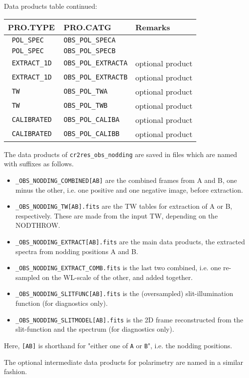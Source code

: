 \pagebreak

Data products table continued:

\begin{tabular}{|l|l|l|}
    \hline
    \textbf{PRO.TYPE} &
    \textbf{PRO.CATG} &
    \textbf{Remarks} \\
    \hline
    \texttt{   POL\_SPEC     } & \texttt{OBS\_POL\_SPECA}                & \\
    \texttt{   POL\_SPEC     } & \texttt{OBS\_POL\_SPECB}                & \\
\texttt{   EXTRACT\_1D     } & \texttt{OBS\_POL\_EXTRACTA}                & optional product\\
\texttt{   EXTRACT\_1D     } & \texttt{OBS\_POL\_EXTRACTB}                & optional product\\
\texttt{   TW     } & \texttt{OBS\_POL\_TWA}                & optional product\\
\texttt{   TW     } & \texttt{OBS\_POL\_TWB}                & optional product\\
\texttt{   CALIBRATED     } & \texttt{OBS\_POL\_CALIBA}                & optional product\\
\texttt{   CALIBRATED     } & \texttt{OBS\_POL\_CALIBB}                & optional product\\
\hline
\end{tabular}
\label{tab:pol-prods}

\hrulefill

The data products of \texttt{cr2res\_obs\_nodding} are saved in files which are
named with suffixes as follows.
\begin{itemize}
    \item \verb!_OBS_NODDING_COMBINED[AB]! are the combined frames from A and B, one minus the other, i.e. one positive and one negative image, before extraction.
    \item \verb!_OBS_NODDING_TW[AB].fits! are the TW tables for extraction of A or B, respectively. These are made from the input TW, depending on the NODTHROW.
    \item \verb!_OBS_NODDING_EXTRACT[AB].fits! are the main data products, the extracted spectra from nodding positions A and B.
    \item \verb!_OBS_NODDING_EXTRACT_COMB.fits! is the last two combined, i.e. one re-sampled on the WL-scale of the other, and added together.
    \item \verb!_OBS_NODDING_SLITFUNC[AB].fits! is the (oversampled) slit-illumination function (for diagnostics only).
    \item \verb!_OBS_NODDING_SLITMODEL[AB].fits! is the 2D frame reconstructed from the slit-function and the spectrum (for diagnostics only).

\end{itemize}

Here, \verb![AB]! is shorthand for "either one of \verb!A! or \verb!B!", i.e.
the nodding positions.

The optional intermediate data products for polarimetry are named in a similar
fashion.